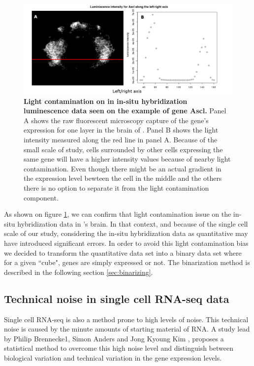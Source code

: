    \begin{figure}[bth]
\centerline{\includegraphics[width=\linewidth]{gfx/chapter2/whybina.png}}
\caption{{\bf Light contamination on in in-situ hybridization luminescence data seen on the example of gene Ascl.} Panel A shows the raw fluorescent microscopy capture of the gene's expression for one layer in the brain of \platy{}. Panel B shows the light intensity measured along the red line in panel A. Because of the small scale of study, cells surrounded by other cells expressing the same gene will have a higher intensity values because of nearby light contamination. Even though there might be an actual gradient in the expression level bewteen the cell in the middle and the others there is no option to separate it from the light contamination component.}\label{fig:why_binarize}
	\end{figure}
  
  As shown on figure \ref{fig:why_binarize}, we can confirm that light contamination issue on the in-situ hybridization data in \platy{}'s brain. In that context, and because of the single cell scale of our study, considering the in-situ hybridization data as quantitative may have introduced significant errors. In order to avoid this light contamination bias we decided to transform the quantitative data set into a binary data set where for a given ``cube", genes are simply expressed or not. The binarization method is described in the following section \ref{sec:binarizing}.
  


  \subsection{Technical noise in single cell RNA-seq data}
  Single cell RNA-seq is also a method prone to high levels of noise. This technical noise is caused by the minute amounts of starting material of RNA. A study lead by Philip Brennecke1, Simon Anders and Jong Kyoung Kim \cite{brennecke13}, proposes a statistical method to overcome this high noise level and distinguish between biological variation and technical variation in the gene expression levels.\\
  
